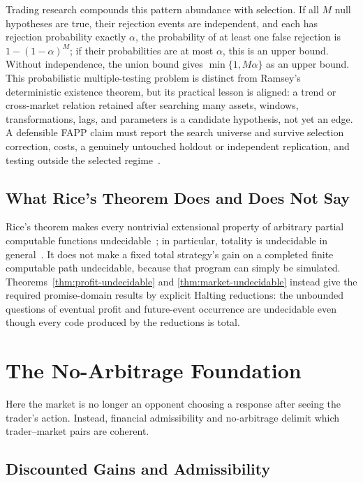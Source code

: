 \documentclass[aps,pra,reprint,superscriptaddress,amsmath,amssymb,floatfix]{revtex4-2}
\theoremstyle{plain}
\theoremstyle{definition}
\theoremstyle{remark}
\begin{document}
Trading research compounds this pattern abundance with selection. If all
\(M\) null hypotheses are true, their rejection events are independent, and
each has rejection probability exactly \(\alpha\), the probability of at least
one false rejection is
\(1-(1-\alpha)^M\); if their probabilities are at most \(\alpha\), this is an
upper bound. Without independence, the union bound gives
\(\min\{1,M\alpha\}\) as an upper bound. This
probabilistic multiple-testing problem is distinct from Ramsey's deterministic
existence theorem, but its practical lesson is aligned: a trend or cross-market
relation retained after searching many assets, windows, transformations, lags,
and parameters is a candidate hypothesis, not yet an edge. A defensible FAPP
claim must report the search universe and survive selection correction, costs,
a genuinely untouched holdout or independent replication, and testing outside
the selected regime~\cite{BaileyLopez2014}.

\subsection{What Rice's Theorem Does and Does Not Say}

Rice's theorem makes every nontrivial extensional property of arbitrary partial
computable functions undecidable~\cite{Rice-1953}; in particular, totality is
undecidable in general~\cite{turing-36}. It does not make a fixed total
strategy's gain on a completed finite computable path undecidable, because that
program can simply be simulated. Theorems~\ref{thm:profit-undecidable} and
\ref{thm:market-undecidable} instead give the required promise-domain results
by explicit Halting reductions: the unbounded questions of eventual profit and
future-event occurrence are undecidable even though every code produced by the
reductions is total.

\section{The No-Arbitrage Foundation}
\label{sec:noarb}

Here the market is no longer an opponent choosing a response after seeing the
trader's action. Instead, financial admissibility and no-arbitrage delimit
which trader--market pairs are coherent.

\subsection{Discounted Gains and Admissibility}
\end{document}
